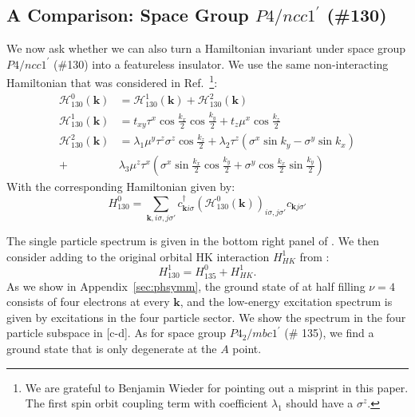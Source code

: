 \documentclass[prb,aps,amssymb,twocolumn,notitlepage]{revtex4-2}
\begin{document}
\subsection{A Comparison: Space Group $P4/ncc1^\prime$ (\#130)}
We now ask whether we can also turn a Hamiltonian invariant under space group $P4/ncc1^\prime$ (\#130) into a featureless insulator. 
We use the same non-interacting Hamiltonian that was considered in Ref.~\cite{wieder2016double}\footnote{We are grateful to Benjamin Wieder for pointing out a misprint in this paper. 
The first spin orbit coupling term with coefficient $\lambda_1$ should have a $\sigma^z$.}:
\begin{align}
    \label{eq:130noninteractingH}
    \mathcal{H}^{0}_{130}(\mathbf{k})&=\mathcal{H}^{1}_{130}(\mathbf{k})+\mathcal{H}^{2}_{130}(\mathbf{k})\\
    \mathcal{H}^{1}_{130}(\mathbf{k})&=t_{xy}\tau^x\cos\tfrac{k_x}{2}\cos\tfrac{k_y}{2}+t_{z}\mu^x\cos\tfrac{k_z}{2}\\
    \mathcal{H}^{2}_{130}(\mathbf{k})&=\lambda_1\mu^y\tau^z\sigma^z\cos\tfrac{k_z}{2}+\lambda_2\tau^z(\sigma^x\sin k_y-\sigma^y\sin k_x)\nonumber\\
    +&\lambda_3\mu^z\tau^x\left(\sigma^x\sin\tfrac{k_x}{2}\cos\tfrac{k_y}{2}+\sigma^y\cos\tfrac{k_x}{2}\sin\tfrac{k_y}{2}\right)
\end{align}
With the corresponding Hamiltonian given by:
\begin{equation}\label{eq:130ham0}
    H^{0}_{130}=\sum_{\mathbf{k}, i\sigma,j\sigma'}c^\dagger_{\mathbf{k}i\sigma}(\mathcal{H}^{0}_{130}(\mathbf{k}))_{i\sigma,j\sigma'}c_{\mathbf{k}j\sigma'}
\end{equation}

The single particle spectrum is given in the bottom right panel of .
We then consider adding to  the original orbital HK interaction $H^{1}_{HK}$ from :
\begin{equation}\label{eq:sg130u1ham}
    H^{1}_{130}=H^{0}_{135}+H^1_{HK}.
\end{equation}
As we show in Appendix~\ref{sec:phsymm}, the ground state of  at half filling $\nu=4$ consists of four electrons at every $\mathbf{k}$, and the low-energy excitation spectrum is given by excitations in the four particle sector. 
We show the spectrum in the four particle subspace in [c-d]. 
As for space group $P4_2/mbc1^\prime$ (\# 135), we find a ground state that is only degenerate at the $A$ point. 
\end{document}
